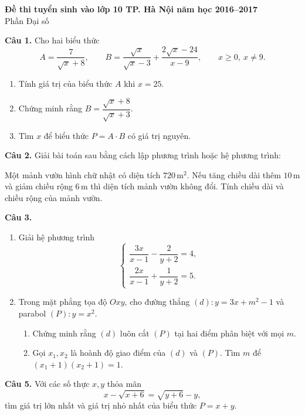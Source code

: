 \documentclass[12pt,a4paper]{article}
\begin{document}
\begin{center}
{\Large\bfseries Đề thi tuyển sinh vào lớp 10 TP. Hà Nội năm học 2016--2017}\\
{\large Phần Đại số}
\end{center}

\textbf{Câu 1.} Cho hai biểu thức
\[
A=\frac{7}{\sqrt{x}+8},\qquad
B=\frac{\sqrt{x}}{\sqrt{x}-3}+\frac{2\sqrt{x}-24}{x-9},
\qquad x\ge 0,\ x\ne 9.
\]
\begin{enumerate}[label=\alph*)]
\item Tính giá trị của biểu thức $A$ khi $x=25$.
\item Chứng minh rằng $B=\dfrac{\sqrt{x}+8}{\sqrt{x}+3}$.
\item Tìm $x$ để biểu thức $P=A\cdot B$ có giá trị nguyên.
\end{enumerate}

\textbf{Câu 2.} Giải bài toán sau bằng cách lập phương trình hoặc hệ phương trình:

Một mảnh vườn hình chữ nhật có diện tích $720\,\mathrm{m}^2$. Nếu tăng chiều dài thêm $10\,\mathrm m$ và giảm chiều rộng $6\,\mathrm m$ thì diện tích mảnh vườn không đổi. Tính chiều dài và chiều rộng của mảnh vườn.

\textbf{Câu 3.}
\begin{enumerate}[label=\alph*)]
\item Giải hệ phương trình
\[
\begin{cases}
\dfrac{3x}{x-1}-\dfrac{2}{y+2}=4,\\[4pt]
\dfrac{2x}{x-1}+\dfrac{1}{y+2}=5.
\end{cases}
\]
\item Trong mặt phẳng tọa độ $Oxy$, cho đường thẳng $(d): y=3x+m^2-1$ và parabol $(P):y=x^2$.
\begin{enumerate}[label=(\alph*)]
\item Chứng minh rằng $(d)$ luôn cắt $(P)$ tại hai điểm phân biệt với mọi $m$.
\item Gọi $x_1,x_2$ là hoành độ giao điểm của $(d)$ và $(P)$. Tìm $m$ để $(x_1+1)(x_2+1)=1$.
\end{enumerate}
\end{enumerate}

\textbf{Câu 5.} Với các số thực $x,y$ thỏa mãn
\[
 x-\sqrt{x+6}=\sqrt{y+6}-y,
\]
tìm giá trị lớn nhất và giá trị nhỏ nhất của biểu thức $P=x+y$.
\end{document}
